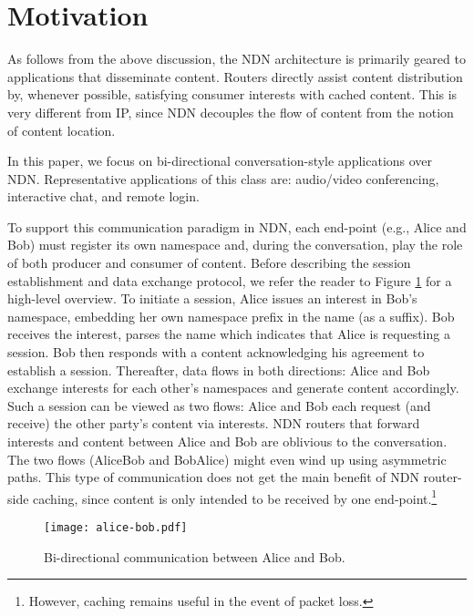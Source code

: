 \documentclass[conference]{IEEEtran}
\begin{document}
\section{Motivation}
\label{sec:motivation}
As follows from the above discussion, the NDN architecture is primarily geared to applications 
that disseminate content. Routers directly assist content distribution by, whenever possible, 
satisfying consumer interests with cached content. This is very different from IP, since 
NDN decouples the flow of content  from the notion of content location. 

In this paper, we focus on bi-directional conversation-style applications over NDN.
Representative applications of this class are: audio/video conferencing, interactive chat, and 
remote login. 

To support this communication paradigm in NDN, each end-point 
(e.g., Alice and Bob) must register its own namespace and, during the conversation, play the 
role of both producer and consumer of content.
Before describing the session establishment and data exchange protocol, we refer the reader to Figure \ref{fig:alice-bob-bidirectional}
for a high-level overview. 
To initiate a session, Alice issues an interest in Bob's namespace, embedding 
her own namespace prefix in the name (as a suffix). Bob receives the interest, 
parses the name which indicates that Alice is requesting a session. 
Bob then responds with a content acknowledging 
his agreement to establish a session. Thereafter, data flows in both directions:  
Alice and Bob exchange interests for each other's namespaces and generate content 
accordingly. Such a session can be viewed as two flows: Alice and Bob each request
(and receive) the other party's content via interests. NDN routers that forward interests and content 
between Alice and Bob are oblivious to the conversation. The two flows 
(AliceBob and BobAlice) might even wind up 
using asymmetric paths. This type of communication does not get the main 
benefit of NDN router-side caching, since content is only intended to be received 
by one end-point.\footnote{However, caching remains useful in the event of packet loss.}

\begin{figure}[htb]
\vspace{0.15cm}
\centering
\texttt{[image: alice-bob.pdf]}
\caption{Bi-directional communication between Alice and Bob.}
\label{fig:alice-bob-bidirectional}
\end{figure}
\end{document}
